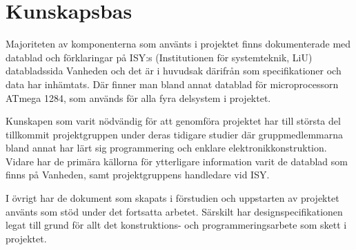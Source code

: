 


\section{Kunskapsbas}

Majoriteten av komponenterna som använts i projektet finns dokumenterade med datablad och förklaringar på ISY:s (Institutionen för systemteknik, LiU) databladssida Vanheden \cite{vanheden} och det är i huvudsak därifrån som specifikationer och data har inhämtats. Där finner man bland annat datablad för microprocessorn ATmega 1284, som används för alla fyra delsystem i projektet. 

Kunskapen som varit nödvändig för att genomföra projektet har till största del tillkommit projektgruppen under deras tidigare studier där gruppmedlemmarna bland annat har lärt sig programmering och enklare elektronikkonstruktion. Vidare har de primära källorna för ytterligare information varit de datablad som finns på Vanheden, samt projektgruppens handledare vid ISY. 

I övrigt har de dokument som skapats i förstudien och uppstarten av projektet använts som stöd under det fortsatta arbetet. Särskilt har designspecifikationen legat till grund för allt det konstruktions- och programmeringsarbete som skett i projektet.